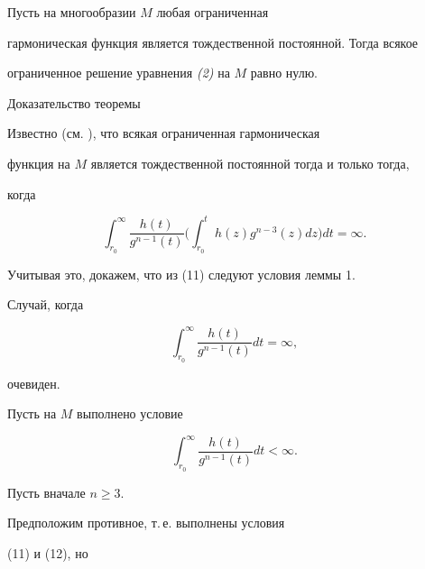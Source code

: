 \begin{thm} Пусть на многообразии $M$ любая ограниченная


гармоническая функция является тождественной постоянной. Тогда всякое


ограниченное решение уравнения {\em (2)} на $M$ равно нулю.


\end{thm}





\begin{pf*}{Доказательство теоремы}


Известно (см. \cite{Gri}), что всякая ограниченная гармоническая


функция на $M$ является тождественной постоянной тогда и только тогда,


когда


\begin{equation}


\int_{r_0}^{\infty}\frac{h(t)}{g^{n-1}(t)}\biggl(\int_{r_0}^{t}


h(z)g^{n-3}(z)dz\biggr)dt = \infty.


\end{equation}


Учитывая это, докажем, что из (11) следуют условия леммы 1.





Случай, когда


$$


\int_{r_0}^{\infty}\frac{h(t)}{g^{n-1}(t)}dt = \infty,


$$


очевиден.





Пусть на $M$ выполнено условие


%


\begin{equation}


\int_{r_0}^{\infty}\frac{h(t)}{g^{n-1}(t)}dt < \infty.


\end{equation}


%


Пусть вначале $n \ge 3$.


Предположим противное, т.\,е. выполнены условия


(11) и (12), но


%


\begin{equation}



\end{equation}
\end{pf*}
